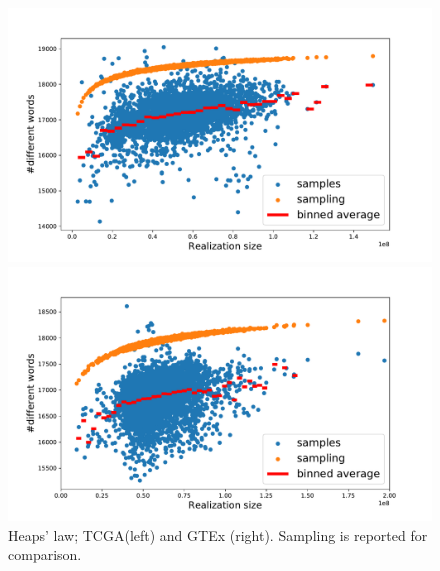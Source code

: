\begin{figure}[htb!]
\begin{minipage}{0.5\textwidth}
    \centering
    \includegraphics[width=0.95\linewidth]{pictures/structure/tcga/heaps_null.pdf}
    \end{minipage}
\hspace{2mm}
\begin{minipage}{0.5\textwidth}
    \centering
    \includegraphics[width=0.95\linewidth]{pictures/structure/gtex/heaps_null.pdf}
    \end{minipage}
\caption{Heaps' law; TCGA(left) and GTEx (right). Sampling is reported for comparison.}
\label{fig:structure/heaps_null}
\end{figure}


